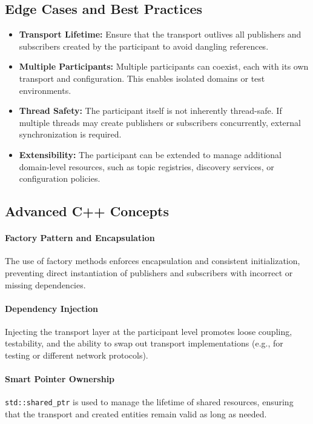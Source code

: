 \documentclass[12pt]{report}
\begin{document}
\subsection{Edge Cases and Best Practices}
\begin{itemize}
    \item \textbf{Transport Lifetime:} Ensure that the transport outlives all publishers and subscribers created by the participant to avoid dangling references.
    \item \textbf{Multiple Participants:} Multiple participants can coexist, each with its own transport and configuration. This enables isolated domains or test environments.
    \item \textbf{Thread Safety:} The participant itself is not inherently thread-safe. If multiple threads may create publishers or subscribers concurrently, external synchronization is required.
    \item \textbf{Extensibility:} The participant can be extended to manage additional domain-level resources, such as topic registries, discovery services, or configuration policies.
\end{itemize}

\subsection{Advanced C++ Concepts}
\paragraph{Factory Pattern and Encapsulation}
The use of factory methods enforces encapsulation and consistent initialization, preventing direct instantiation of publishers and subscribers with incorrect or missing dependencies.

\paragraph{Dependency Injection}
Injecting the transport layer at the participant level promotes loose coupling, testability, and the ability to swap out transport implementations (e.g., for testing or different network protocols).

\paragraph{Smart Pointer Ownership}
\texttt{std::shared\_ptr} is used to manage the lifetime of shared resources, ensuring that the transport and created entities remain valid as long as needed.
\end{document}
